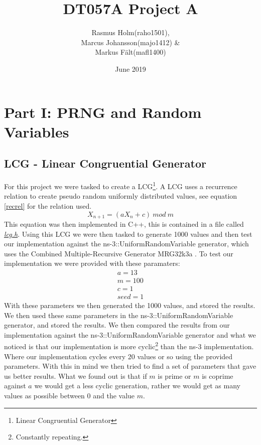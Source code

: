 \documentclass{article}
\title{DT057A Project A}
\author{Rasmus Holm(raho1501),\\Marcus Johansson(majo1412) \&\\Markus Fält(mafl1400)}
\date{June 2019}
\begin{document}
\maketitle
\newpage
\tableofcontents
\newpage
\section{Part I: PRNG and Random Variables} \label{part1}
  \subsection{LCG - Linear Congruential Generator}
    For this project we were tasked to create a LCG\footnote{Linear Congruential Generator}. 
    A LCG uses a recurrence relation to create pseudo random uniformly distributed values, see equation \ref{recrel} for the relation used.
    \begin{equation} \label{recrel}
      X_{n+1} = (aX_{n} + c)\ mod\ m
    \end{equation}
    This equation was then implemented in C++, this is contained in a file called \href{https://github.com/NoRines/simulerings_projekt/blob/master/lcg.h}{\emph{lcg.h}}.
    Using this LCG we were then tasked to generate 1000 values and then test our implementation against the ns-3::UniformRandomVariable generator, which uses the Combined Multiple-Recursive Generator MRG32k3a \cite{l2002object}. 
    To test our implementation we were provided with these paramaters:
    \begin{align*}
      a=13 \\
      m=100 \\
      c=1 \\
      seed=1
    \end{align*}
    With these parameters we then generated the 1000 values, and stored the results.
    We then used these same parameters in the ns-3::UniformRandomVariable generator, and stored the results.
    We then compared the results from our implementation against the ns-3::UniformRandomVariable generator and what we noticed is that our implementation is more cyclic\footnote{Constantly repeating.} than the ns-3 implementation. 
    Where our implementation cycles every 20 values or so using the provided parameters.
    With this in mind we then tried to find a set of parameters that gave us better results.
    What we found out is that if $m$ is prime or $m$ is coprime against $a$ we would get a less cyclic generation, rather we would get as many values as possible between 0 and the value $m$.
\end{document}
